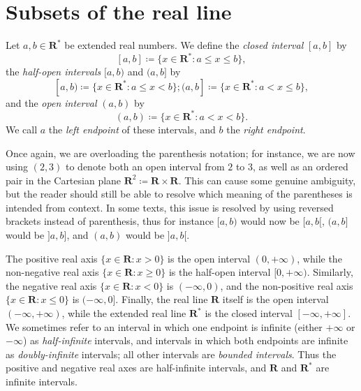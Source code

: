\section{Subsets of the real line}\label{sec 9.1}

\begin{definition}[Intervals]\label{9.1.1}
    Let \(a, b \in \mathbf{R}^*\) be extended real numbers.
    We define the \emph{closed interval} \([a, b]\) by
    \[
        [a, b] \coloneqq \{x \in \mathbf{R}^* : a \leq x \leq b\},
    \]
    the \emph{half-open intervals} \([a, b)\) and \((a, b]\) by
    \[
        [a, b) \coloneqq \{x \in \mathbf{R}^* : a \leq x < b\}; (a, b] \coloneqq \{x \in \mathbf{R}^* : a < x \leq b\},
    \]
    and the \emph{open interval} \((a, b)\) by
    \[
        (a, b) \coloneqq \{x \in \mathbf{R}^* : a < x < b\}.
    \]
    We call \(a\) the \emph{left endpoint} of these intervals, and \(b\) the \emph{right endpoint}.
\end{definition}

\begin{remark}\label{9.1.2}
    Once again, we are overloading the parenthesis notation;
    for instance, we are now using \((2, 3)\) to denote both an open interval from \(2\) to \(3\), as well as an ordered pair in the Cartesian plane \(\mathbf{R}^2 \coloneqq \mathbf{R} \times \mathbf{R}\).
    This can cause some genuine ambiguity, but the reader should still be able to resolve which meaning of the parentheses is intended from context.
    In some texts, this issue is resolved by using reversed brackets instead of parenthesis, thus for instance \([a, b)\) would now be \([a, b[\), \((a, b]\) would be \(]a, b]\), and \((a, b)\) would be \(]a, b[\).
\end{remark}

\begin{example}\label{9.1.3}
    The positive real axis \(\{x \in \mathbf{R} : x > 0\}\) is the open interval \((0, +\infty)\), while the non-negative real axis \(\{x \in \mathbf{R} : x \geq 0\}\) is the half-open interval \([0, +\infty)\).
            Similarly, the negative real axis \(\{x \in \mathbf{R} : x < 0\}\) is \((-\infty, 0)\), and the non-positive real axis \(\{x \in \mathbf{R} : x \leq 0\}\) is \((-\infty, 0]\).
    Finally, the real line \(\mathbf{R}\) itself is the open interval \((-\infty, +\infty)\), while the extended real line \(\mathbf{R}^*\) is the closed interval \([-\infty, +\infty]\).
    We sometimes refer to an interval in which one endpoint is infinite (either \(+\infty\) or \(-\infty\)) as \emph{half-infinite} intervals, and intervals in which both endpoints are infinite as \emph{doubly-infinite} intervals;
    all other intervals are \emph{bounded intervals}.
    Thus the positive and negative real axes are half-infinite intervals, and \(\mathbf{R}\) and \(\mathbf{R}^*\) are infinite intervals.
\end{example}

